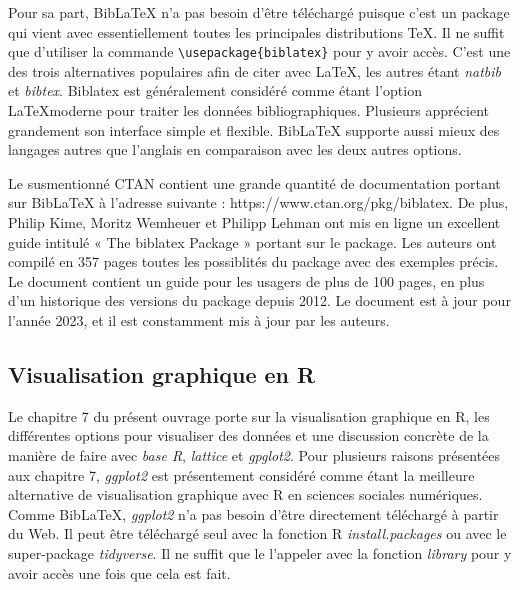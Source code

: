 \documentclass[
  letterpaper,
  DIV=11,
  numbers=noendperiod]{scrreprt}
\begin{document}
Pour sa part, BibLaTeX n'a pas besoin d'être téléchargé puisque c'est un
package qui vient avec essentiellement toutes les principales
distributions TeX. Il ne suffit que d'utiliser la commande
\texttt{\textbackslash{}usepackage\{biblatex\}} pour y avoir accès.
C'est une des trois alternatives populaires afin de citer avec LaTeX,
les autres étant \emph{natbib} et \emph{bibtex}. Biblatex est
généralement considéré comme étant l'option \LaTeX moderne pour traiter
les données bibliographiques. Plusieurs apprécient grandement son
interface simple et flexible. BibLaTeX supporte aussi mieux des langages
autres que l'anglais en comparaison avec les deux autres options.

Le susmentionné CTAN contient une grande quantité de documentation
portant sur BibLaTeX à l'adresse suivante :
https://www.ctan.org/pkg/biblatex. De plus, Philip Kime, Moritz Wemheuer
et Philipp Lehman ont mis en ligne un excellent guide intitulé « The
biblatex Package » portant sur le package. Les auteurs ont compilé en
357 pages toutes les possiblités du package avec des exemples précis. Le
document contient un guide pour les usagers de plus de 100 pages, en
plus d'un historique des versions du package depuis 2012. Le document
est à jour pour l'année 2023, et il est constamment mis à jour par les
auteurs.

\subsection{Visualisation graphique en
R}\label{visualisation-graphique-en-r}

Le chapitre 7 du présent ouvrage porte sur la visualisation graphique en
R, les différentes options pour visualiser des données et une discussion
concrète de la manière de faire avec \emph{base R}, \emph{lattice} et
\emph{gpglot2}. Pour plusieurs raisons présentées aux chapitre 7,
\emph{ggplot2} est présentement considéré comme étant la meilleure
alternative de visualisation graphique avec R en sciences sociales
numériques. Comme BibLaTeX, \emph{ggplot2} n'a pas besoin d'être
directement téléchargé à partir du Web. Il peut être téléchargé seul
avec la fonction R \emph{install.packages} ou avec le super-package
\emph{tidyverse}. Il ne suffit que le l'appeler avec la fonction
\emph{library} pour y avoir accès une fois que cela est fait.
\end{document}
